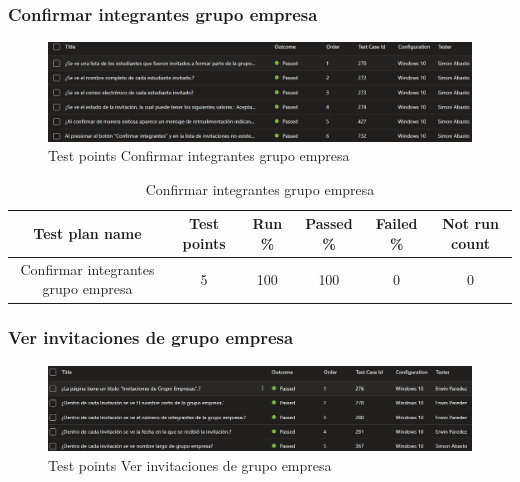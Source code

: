 \documentclass[12pt,letterpaper]{article}
\begin{document}
\subsubsection{Confirmar integrantes grupo empresa}
\begin{figure}[H]
        \centering
        \includegraphics[width=1.1\linewidth]{cases confirmar integrantes de grupo empresa.png}
        \caption{Test points Confirmar integrantes grupo empresa}
    \end{figure}


 \begin{table}[h] %
    \centering %
    \caption{Confirmar integrantes grupo empresa} %
    \begin{tabular}{|c|c|c|c|c|c|}
        \rowcolor{green} %
        \hline
        Test plan name & Test points & Run \% & Passed \% & Failed \% & Not run count \\
        \hline
        Confirmar integrantes grupo empresa & 5 & 100 & 100 & 0 & 0 \\
        \hline
    \end{tabular}
\end{table}







\subsubsection{Ver invitaciones de grupo empresa}
\begin{figure}[H]
        \centering
        \includegraphics[width=1.1\linewidth]{cases ver invitaciones de grupo empresa.png}
        \caption{Test points Ver invitaciones de grupo empresa}
    \end{figure}
\end{document}
